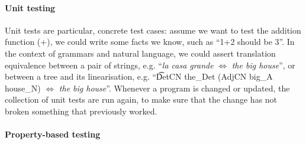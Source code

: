 





\paragraph{Unit testing}

Unit tests are particular, concrete test cases: assume we want to test the
addition function (+), we could write some facts we know, such as
``1+2 should be 3''. In the context of grammars and natural language,
we could assert translation equivalence between a pair of strings,
e.g. ``\emph{la casa grande} $\Leftrightarrow$ \emph{the big house}'',
or between a tree and its linearisation, e.g. ``\t{DetCN the\_Det
  (AdjCN  big\_A house\_N)} $\Leftrightarrow$ \emph{the big house}''.
Whenever a program is changed or updated, the collection of unit tests
are run again, to make sure that the change has not broken something
that previously worked.

\paragraph{Property-based testing}

